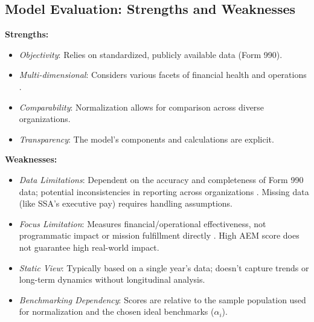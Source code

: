 \documentclass[12pt]{article}
\begin{document}
\subsection{Model Evaluation: Strengths and Weaknesses} %
\textbf{Strengths:}
\begin{itemize}
    \item \textit{Objectivity}: Relies on standardized, publicly available data (Form 990).
    \item \textit{Multi-dimensional}: Considers various facets of financial health and operations \cite{bowman2011}.
    \item \textit{Comparability}: Normalization allows for comparison across diverse organizations.
    \item \textit{Transparency}: The model's components and calculations are explicit.
\end{itemize}
\textbf{Weaknesses:}
\begin{itemize}
    \item \textit{Data Limitations}: Dependent on the accuracy and completeness of Form 990 data; potential inconsistencies in reporting across organizations \cite{gee2023}. Missing data (like SSA's executive pay) requires handling assumptions.
    \item \textit{Focus Limitation}: Measures financial/operational effectiveness, not programmatic impact or mission fulfillment directly \cite{weisbrod1998}. High AEM score does not guarantee high real-world impact.
    \item \textit{Static View}: Typically based on a single year's data; doesn't capture trends or long-term dynamics without longitudinal analysis.
    \item \textit{Benchmarking Dependency}: Scores are relative to the sample population used for normalization and the chosen ideal benchmarks ($\alpha_i$).
\end{itemize}
\end{document}
